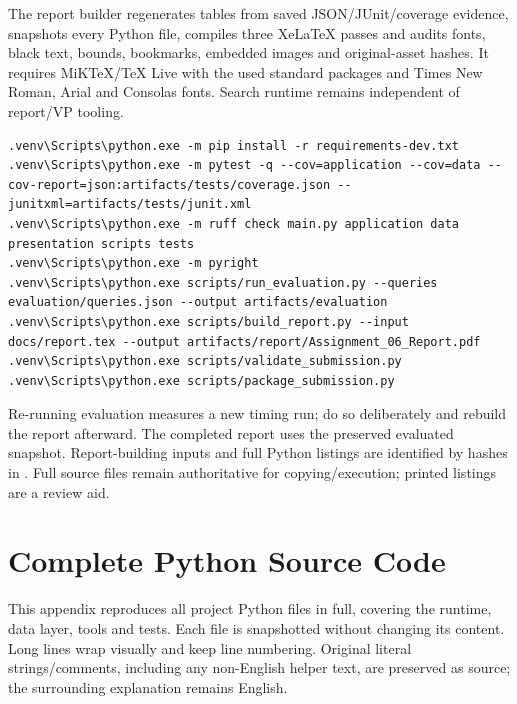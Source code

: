 \documentclass[11pt,a4paper]{article}
\newcommand{\reporttable}[1]{}
\begin{document}
The report builder regenerates tables from saved JSON/JUnit/coverage evidence, snapshots every Python file, compiles three XeLaTeX passes and audits fonts, black text, bounds, bookmarks, embedded images and original-asset hashes. It requires MiKTeX/TeX Live with the used standard packages and Times New Roman, Arial and Consolas fonts. Search runtime remains independent of report/VP tooling.
\begin{lstlisting}[language={},caption={Testing, evaluation and report reproduction commands}]
.venv\Scripts\python.exe -m pip install -r requirements-dev.txt
.venv\Scripts\python.exe -m pytest -q --cov=application --cov=data --cov-report=json:artifacts/tests/coverage.json --junitxml=artifacts/tests/junit.xml
.venv\Scripts\python.exe -m ruff check main.py application data presentation scripts tests
.venv\Scripts\python.exe -m pyright
.venv\Scripts\python.exe scripts/run_evaluation.py --queries evaluation/queries.json --output artifacts/evaluation
.venv\Scripts\python.exe scripts/build_report.py --input docs/report.tex --output artifacts/report/Assignment_06_Report.pdf
.venv\Scripts\python.exe scripts/validate_submission.py
.venv\Scripts\python.exe scripts/package_submission.py
\end{lstlisting}
Re-running evaluation measures a new timing run; do so deliberately and rebuild the report afterward. The completed report uses the preserved evaluated snapshot. Report-building inputs and full Python listings are identified by hashes in . Full source files remain authoritative for copying/execution; printed listings are a review aid.

\clearpage\section{Complete Python Source Code}\label{app:source}
This appendix reproduces all project Python files in full, covering the runtime, data layer, tools and tests. Each file is snapshotted without changing its content. Long lines wrap visually and keep line numbering. Original literal strings/comments, including any non-English helper text, are preserved as source; the surrounding explanation remains English.
\reporttable{python_listings.tex}
\end{document}
